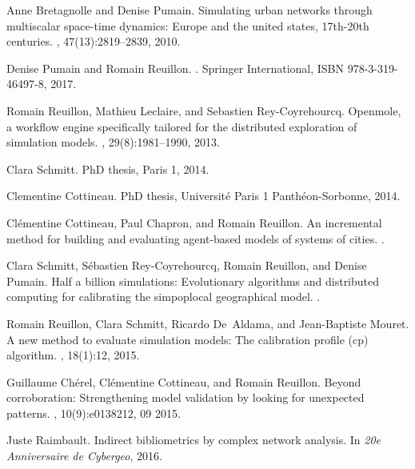 \documentclass[runningheads,a4paper]{llncs2e/llncs}
\begin{document}
\begin{thebibliography}{10}
Anne Bretagnolle and Denise Pumain.
\newblock Simulating urban networks through multiscalar space-time dynamics:
  Europe and the united states, 17th-20th centuries.
, 47(13):2819--2839, 2010.

Denise Pumain and Romain Reuillon.
.
\newblock Springer International, ISBN 978-3-319-46497-8, 2017.

Romain Reuillon, Mathieu Leclaire, and Sebastien Rey-Coyrehourcq.
\newblock Openmole, a workflow engine specifically tailored for the distributed
  exploration of simulation models.
, 29(8):1981--1990, 2013.

Clara Schmitt.
\newblock PhD thesis, Paris 1, 2014.

Clementine Cottineau.
\newblock PhD thesis, Universit{\'e} Paris 1 Panth{\'e}on-Sorbonne, 2014.

Cl{\'e}mentine Cottineau, Paul Chapron, and Romain Reuillon.
\newblock An incremental method for building and evaluating agent-based models
  of systems of cities.
.

Clara Schmitt, S{\'e}bastien Rey-Coyrehourcq, Romain Reuillon, and Denise
  Pumain.
\newblock Half a billion simulations: Evolutionary algorithms and distributed
  computing for calibrating the simpoplocal geographical model.
.

Romain Reuillon, Clara Schmitt, Ricardo De~Aldama, and Jean-Baptiste Mouret.
\newblock A new method to evaluate simulation models: The calibration profile
  (cp) algorithm.
,
  18(1):12, 2015.

Guillaume Ch{\'e}rel, Cl{\'e}mentine Cottineau, and Romain Reuillon.
\newblock Beyond corroboration: Strengthening model validation by looking for
  unexpected patterns.
, 10(9):e0138212, 09 2015.

Juste Raimbault.
\newblock Indirect bibliometrics by complex network analysis.
\newblock In {\em 20e Anniversaire de Cybergeo}, 2016.


\end{thebibliography}
\end{document}

